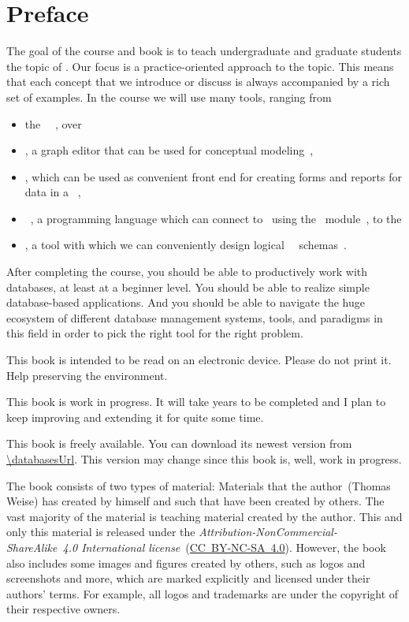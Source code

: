 \chapter*{Preface}%
%
%
The goal of the course and book is to teach undergraduate and graduate students the topic of .
Our focus is a practice-oriented approach to the topic.
This means that each concept that we introduce or discuss is always accompanied by a rich set of examples.
In the course we will use many tools, ranging from%
%
\begin{itemize}%
\item the \postgresql\ ~\cite{TA2024DDAMWPAM,FP2023LP,OH2017PUAR,B2024PELUYDW}, over%
\item \yEd, a graph editor that can be used for conceptual modeling~\cite{SG2015MDAWY,Y2011YGEM},%
\item \libreofficeBase, which can be used as convenient front end for creating forms and reports for data in a ~\cite{FNFHWSKLSSGLFRSRPLJG2022BG7R1BOL7C,S2022L7PFEUU},%
\item \python~\cite{programmingWithPython}, a programming language which can connect to \postgresql\ using the \psycopg\ module~\cite{VDGE2010P}, to the%
\item \pgmodeler, a tool with which we can conveniently design logical \postgresql\ \db\ schemas~\cite{AES2006PPDM}.%
\end{itemize}%
%
After completing the course, you should be able to productively work with databases, at least at a beginner level.
You should be able to realize simple database-based applications.
And you should be able to navigate the huge ecosystem of different database management systems, tools, and paradigms in this field in order to pick the right tool for the right problem.

This book is intended to be read on an electronic device.
Please do not print it.
Help preserving the environment.

This book is work in progress.
It will take years to be completed and I plan to keep improving and extending it for quite some time.

This book is freely available.
You can download its newest version from \expandafter\url{\databasesUrl}.
This version may change since this book is, well, work in progress.

The book consists of two types of material:
Materials that the author~(Thomas Weise) has created by himself and such that have been created by others.
The vast majority of the material is teaching material created by the author.
This and only this material is released under the \emph{Attribution-NonCommercial-ShareAlike~4.0 International license}~(\href{http://creativecommons.org/licenses/by-nc-sa/4.0}{\mbox{CC~BY-NC-SA~4.0}}).
However, the book also includes some images and figures created by others, such as logos and screenshots and more, which are marked explicitly and licensed under their authors' terms.
For example, all logos and trademarks are under the copyright of their respective owners.

